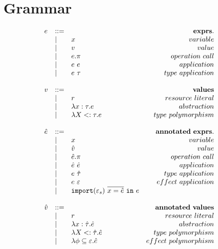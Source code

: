 \documentclass{llncs}
\newcommand{\keywadj}[1]{\mathtt{#1}}
\newcommand{\keyw}[1]{\keywadj{#1}~}
\newcommand{\kw}[1]{\keyw{ #1 }}
\newcommand{\kwa}[1]{\keywadj{ #1 }}
\begin{document}
\section{Grammar}

\[
\begin{array}{lll}

\begin{array}{lllr}

e & ::= & ~ & \bf{exprs.} \\
	& | & x & variable \\
	& | & v & value \\
	& | & e.\pi & operation~call \\
	& | & e ~ e & application \\
	& | & e~\tau & type~application \\
	&&\\

v & ::= & ~ & \bf{values} \\
	& | & r & resource~literal \\
	& | & \lambda x: \tau.e & abstraction \\
	& | & \lambda X <: \tau. e & type~polymorphism \\
	&&\\
	
\hat e & ::= & ~ & \bf{annotated~exprs.} \\
	& | & x & variable \\
	& | & \hat v & value \\
	& | & \hat e.\pi & operation~call\\
	& | & \hat e ~ \hat e & application \\
	& | & e~\hat \tau & type~application \\
	& | & e~\varepsilon & effect~application \\
	& | & \kwa{import}(\varepsilon_s)~\overline{x = \hat e}~\kw{in} e\\
	&&\\

\hat v & ::= & ~ & \bf{annotated~values} \\
	& | & r & resource~literal \\
	& | & \lambda x: \hat \tau.\hat e & abstraction \\
	& | & \lambda X <: \hat \tau. \hat e & type~polymorphism \\
	& | & \lambda \phi \subseteq \varepsilon. \hat e & effect~polymorphism \\
	&&\\


\end{array}
\end{array}\]
\end{document}
